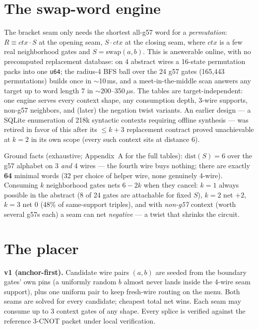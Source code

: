 \documentclass[11pt]{article}
\newcommand{\code}[1]{\texttt{#1}}
\begin{document}
\section{The swap-word engine}

The bracket seam only needs the shortest all-g57 word for a
\emph{permutation}: $R \equiv \mathit{ctx}\cdot S$ at the opening seam,
$S\cdot \mathit{ctx}$ at the closing seam, where $\mathit{ctx}$ is a few real
neighborhood gates and $S = \mathrm{swap}(a,b)$. This is answerable online,
with no precomputed replacement database: on 4 abstract wires a 16-state
permutation packs into one \code{u64}; the radius-4 BFS ball over the 24 g57
gates (165{,}443 permutations) builds once in $\sim$10\,ms, and a
meet-in-the-middle scan answers any target up to word length 7 in
$\sim$200--350\,$\mu$s. The tables are target-independent: one engine serves
every context shape, any consumption depth, 3-wire supports, non-g57
neighbors, and (later) the negation twist variants. An earlier design ---
a SQLite enumeration of 218k syntactic contexts requiring offline synthesis
--- was retired in favor of this after its $\le k{+}3$ replacement contract
proved unachievable at $k{=}2$ in its own scope (every such context sits at
distance 6).

Ground facts (exhaustive; Appendix~A for the full tables):
$\mathrm{dist}(S) = 6$ over the g57 alphabet on 3 \emph{and} 4 wires ---
the fourth wire buys nothing; there are exactly \textbf{64} minimal words
(32 per choice of helper wire, none genuinely 4-wire). Consuming $k$
neighborhood gates nets $6-2k$ when they cancel: $k{=}1$ always possible in
the abstract (8 of 24 gates are attachable for fixed $S$), $k{=}2$ net $+2$,
$k{=}3$ net $0$ (48\% of same-support triples), and with \emph{non-g57}
context (worth several g57s each) a seam can net \emph{negative} --- a twist
that shrinks the circuit.

\section{The placer}

\textbf{v1 (anchor-first).} Candidate wire pairs $(a,b)$ are seeded from the
boundary gates' own pins (a uniformly random $b$ almost never lands inside
the 4-wire seam support), plus one uniform pair to keep fresh-wire routing on
the menu. Both seams are solved for every candidate; cheapest total net wins.
Each seam may consume up to 3 context gates of any shape. Every splice is
verified against the reference 3-CNOT packet under local verification.
\end{document}
